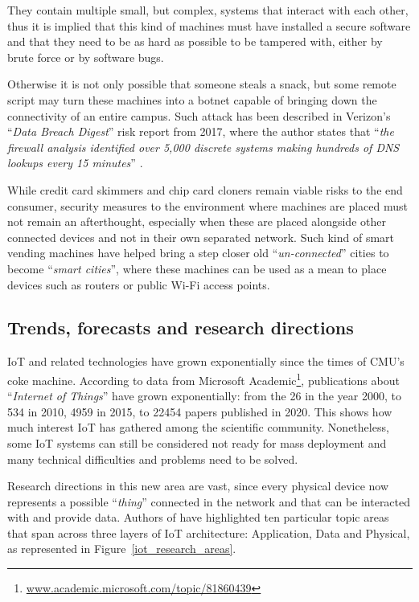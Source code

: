 			They contain multiple small, but complex, systems that interact with each other, thus it is implied that this kind of machines must have installed a secure software and that they need to be as hard as possible to be tampered with, either by brute force or by software bugs.
				
			Otherwise it is not only possible that someone steals a snack, but some remote script may turn these machines into a botnet capable of bringing down the connectivity of an entire campus.
			Such attack has been described in Verizon's ``\textit{Data Breach Digest}'' risk report from 2017, where the author states that ``\textit{the firewall analysis identified over 5,000 discrete systems making hundreds of DNS lookups every 15 minutes}'' \cite{DataBreachDigest}.
			
			While credit card skimmers and chip card cloners remain viable risks to the end consumer, security measures to the environment where machines are placed must not remain an afterthought, especially when these are placed alongside other connected devices and not in their own separated network.
			Such kind of smart vending machines have helped bring a step closer old ``\textit{un-connected}'' cities to become ``\textit{smart cities}'', where these machines can be used as a mean to place devices such as routers or public Wi-Fi access points.
	
		\subsection{Trends, forecasts and research directions}\label{sec:trends}
	
			IoT and related technologies have grown exponentially since the times of CMU's coke machine.
			According to data from Microsoft Academic\footnote{ \url{www.academic.microsoft.com/topic/81860439}}, publications about ``\textit{Internet of Things}'' have grown exponentially: from the 26 in the year 2000, to 534 in 2010, 4959 in 2015, to 22454 papers published in 2020.
			This shows how much interest IoT has gathered among the scientific community.
			Nonetheless, some IoT systems can still be considered not ready for mass deployment and many technical difficulties and problems need to be solved.
	
			Research directions in this new area are vast, since every physical device now represents a possible ``\textit{thing}'' connected in the network and that can be interacted with and provide data.
			Authors of \cite{9319033} have highlighted ten particular topic areas that span across three layers of IoT architecture: Application, Data and Physical, as represented in Figure~\ref{iot_research_areas}.
		
